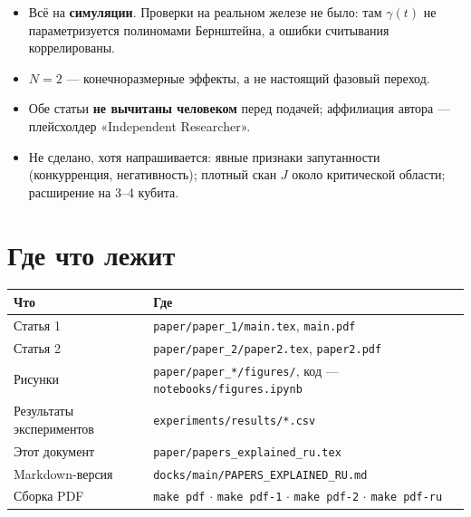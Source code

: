 \documentclass[12pt,a4paper]{article}
\newcommand{\code}[1]{\texttt{#1}}
\begin{document}
\begin{itemize}
  \item Всё на \textbf{симуляции}. Проверки на реальном железе не было: там
        $\gamma(t)$ не параметризуется полиномами Бернштейна, а ошибки
        считывания коррелированы.
  \item $N=2$ — конечноразмерные эффекты, а не настоящий фазовый переход.
  \item Обе статьи \textbf{не вычитаны человеком} перед подачей; аффилиация
        автора — плейсхолдер «Independent Researcher».
  \item Не сделано, хотя напрашивается: явные признаки запутанности
        (конкурренция, негативность); плотный скан $J$ около критической
        области; расширение на 3–4 кубита.
\end{itemize}

\section{Где что лежит}

\begin{center}
\begin{tabular}{@{}p{6cm}p{8cm}@{}}
\toprule
Что & Где \\
\midrule
Статья 1 & \code{paper/paper\_1/main.tex}, \code{main.pdf} \\
Статья 2 & \code{paper/paper\_2/paper2.tex}, \code{paper2.pdf} \\
Рисунки & \code{paper/paper\_*/figures/}, код — \code{notebooks/figures.ipynb} \\
Результаты экспериментов & \code{experiments/results/*.csv} \\
Этот документ & \code{paper/papers\_explained\_ru.tex} \\
Markdown-версия & \code{docks/main/PAPERS\_EXPLAINED\_RU.md} \\
Сборка PDF & \code{make pdf} $\cdot$ \code{make pdf-1} $\cdot$ \code{make pdf-2}
  $\cdot$ \code{make pdf-ru} \\
\bottomrule
\end{tabular}
\end{center}
\end{document}
